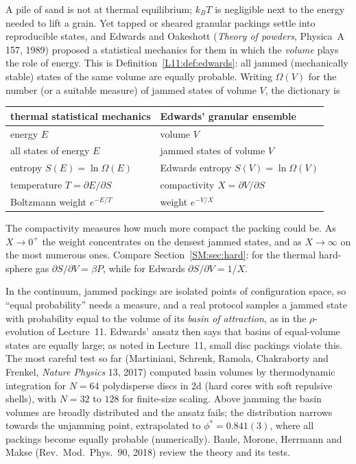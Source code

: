 A pile of sand is not at thermal equilibrium; $k_BT$ is negligible next to the energy needed to lift a
grain. Yet tapped or sheared granular packings settle into reproducible states, and Edwards and
Oakeshott (\emph{Theory of powders}, Physica~A 157, 1989) proposed a statistical mechanics for them in
which the \emph{volume} plays the role of energy. This is Definition~\ref{L11:def:edwards}: all jammed
(mechanically stable) states of the same volume are equally probable. Writing $\Omega(V)$ for the number
(or a suitable measure) of jammed states of volume $V$, the dictionary is
\begin{center}
\renewcommand{\arraystretch}{1.2}
\begin{tabular}{ll}
\toprule
thermal statistical mechanics & Edwards' granular ensemble\\
\midrule
energy $E$ & volume $V$\\
all states of energy $E$ & jammed states of volume $V$\\
entropy $S(E)=\ln\Omega(E)$ & Edwards entropy $S(V)=\ln\Omega(V)$\\
temperature $T=\partial E/\partial S$ & compactivity $X=\partial V/\partial S$\\
Boltzmann weight $e^{-E/T}$ & weight $e^{-V/X}$\\
\bottomrule
\end{tabular}
\end{center}
The compactivity measures how much more compact the packing could be. As $X\to0^+$ the weight
concentrates on the densest jammed states, and as $X\to\infty$ on the most numerous ones. Compare
Section~\ref{SM:sec:hard}: for the thermal hard-sphere gas $\partial S/\partial V=\beta P$, while for
Edwards $\partial S/\partial V=1/X$.

In the continuum, jammed packings are isolated points of configuration space, so ``equal
probability'' needs a measure, and a real protocol samples a jammed state with probability equal to the
volume of its \emph{basin of attraction}, as in the $\rho$-evolution of Lecture~11. Edwards' ansatz then
says that basins of equal-volume states are equally large; as noted in Lecture~11, small disc packings
violate this. The most careful test so far (Martiniani, Schrenk, Ramola, Chakraborty and Frenkel,
\emph{Nature Physics} 13, 2017) computed basin volumes by thermodynamic integration for $N=64$
polydisperse discs in $2$d (hard cores with soft repulsive shells), with $N=32$ to $128$ for finite-size
scaling. Above jamming the basin volumes are broadly distributed and the ansatz fails; the distribution
narrows towards the unjamming point, extrapolated to $\phi^*=0.841(3)$, where all packings become
equally probable (numerically). Baule, Morone, Herrmann and Makse (Rev.\ Mod.\ Phys.\ 90, 2018) review
the theory and its tests.

